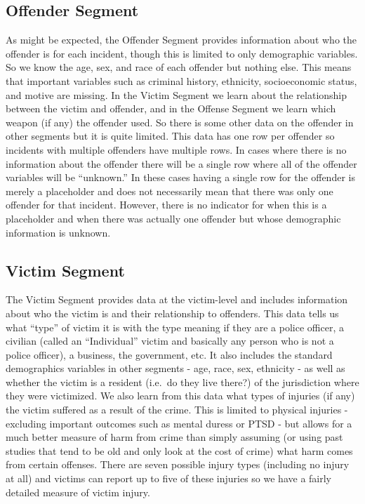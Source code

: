 \documentclass[
]{krantz}
\begin{document}
\subsection{Offender Segment}\label{offender-segment}

As might be expected, the Offender Segment provides
information about who the offender is for each incident,
though this is limited to only demographic variables. So we
know the age, sex, and race of each offender but nothing
else. This means that important variables such as criminal
history, ethnicity, socioeconomic status, and motive are
missing. In the Victim Segment we learn about the
relationship between the victim and offender, and in the
Offense Segment we learn which weapon (if any) the offender
used. So there is some other data on the offender in other
segments but it is quite limited. This data has one row per
offender so incidents with multiple offenders have multiple
rows. In cases where there is no information about the
offender there will be a single row where all of the
offender variables will be ``unknown.'' In these cases
having a single row for the offender is merely a placeholder
and does not necessarily mean that there was only one
offender for that incident. However, there is no indicator
for when this is a placeholder and when there was actually
one offender but whose demographic information is unknown.

\subsection{Victim Segment}\label{victim-segment}

The Victim Segment provides data at the victim-level and
includes information about who the victim is and their
relationship to offenders. This data tells us what ``type''
of victim it is with the type meaning if they are a police
officer, a civilian (called an ``Individual'' victim and
basically any person who is not a police officer), a
business, the government, etc. It also includes the standard
demographics variables in other segments - age, race, sex,
ethnicity - as well as whether the victim is a resident
(i.e.~do they live there?) of the jurisdiction where they
were victimized. We also learn from this data what types of
injuries (if any) the victim suffered as a result of the
crime. This is limited to physical injuries - excluding
important outcomes such as mental duress or PTSD - but
allows for a much better measure of harm from crime than
simply assuming (or using past studies that tend to be old
and only look at the cost of crime) what harm comes from
certain offenses. There are seven possible injury types
(including no injury at all) and victims can report up to
five of these injuries so we have a fairly detailed measure
of victim injury.
\end{document}
